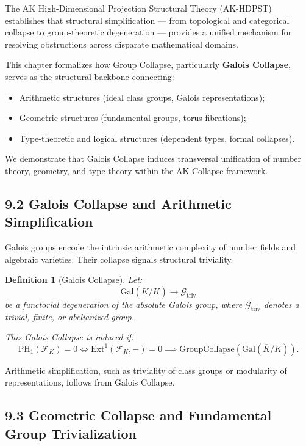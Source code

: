 \documentclass[11pt]{article}
\newtheorem{definition}[theorem]{Definition}
\begin{document}
The AK High-Dimensional Projection Structural Theory (AK-HDPST) establishes that structural simplification — from topological and categorical collapse to group-theoretic degeneration — provides a unified mechanism for resolving obstructions across disparate mathematical domains.

This chapter formalizes how Group Collapse, particularly \textbf{Galois Collapse}, serves as the structural backbone connecting:

\begin{itemize}
    \item Arithmetic structures (ideal class groups, Galois representations);
    \item Geometric structures (fundamental groups, torus fibrations);
    \item Type-theoretic and logical structures (dependent types, formal collapses).
\end{itemize}

We demonstrate that Galois Collapse induces transversal unification of number theory, geometry, and type theory within the AK Collapse framework.

\subsection*{9.2 Galois Collapse and Arithmetic Simplification}

Galois groups encode the intrinsic arithmetic complexity of number fields and algebraic varieties. Their collapse signals structural triviality.

\begin{definition}[Galois Collapse]
Let:
\[
\mathrm{Gal}(\overline{K}/K) \longrightarrow \mathcal{G}_{\mathrm{triv}}
\]
be a functorial degeneration of the absolute Galois group, where \( \mathcal{G}_{\mathrm{triv}} \) denotes a trivial, finite, or abelianized group.

This Galois Collapse is induced if:
\[
\mathrm{PH}_1(\mathcal{F}_K) = 0 \iff \mathrm{Ext}^1(\mathcal{F}_K, -) = 0 \implies \mathrm{GroupCollapse}(\mathrm{Gal}(\overline{K}/K)).
\]
\end{definition}

Arithmetic simplification, such as triviality of class groups or modularity of representations, follows from Galois Collapse.

\subsection*{9.3 Geometric Collapse and Fundamental Group Trivialization}
\end{document}
